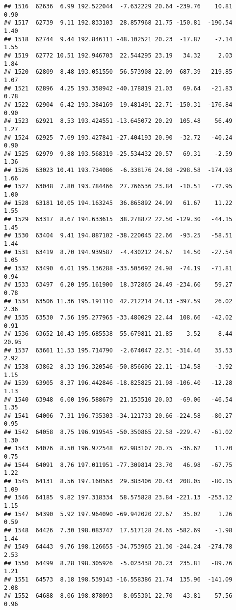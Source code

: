 \documentclass[]{article}
\begin{document}
\begin{verbatim}
## 1516  62636  6.99 192.522044  -7.632229 20.64 -239.76    10.81  0.90
## 1517  62739  9.11 192.833103  28.857968 21.75 -150.81  -190.54  1.40
## 1518  62744  9.44 192.846111 -48.102521 20.23  -17.87    -7.14  1.55
## 1519  62772 10.51 192.946703  22.544295 23.19   34.32     2.03  1.84
## 1520  62809  8.48 193.051550 -56.573908 22.09 -687.39  -219.85  1.07
## 1521  62896  4.25 193.358942 -40.178819 21.03   69.64   -21.83  0.78
## 1522  62904  6.42 193.384169  19.481491 22.71 -150.31  -176.84  0.90
## 1523  62921  8.53 193.424551 -13.645072 20.29  105.48    56.49  1.27
## 1524  62925  7.69 193.427841 -27.404193 20.90  -32.72   -40.24  0.90
## 1525  62979  9.88 193.568319 -25.534432 20.57   69.31    -2.59  1.36
## 1526  63023 10.41 193.734086  -6.338176 24.08 -298.58  -174.93  1.66
## 1527  63048  7.80 193.784466  27.766536 23.84  -10.51   -72.95  1.00
## 1528  63181 10.05 194.163245  36.865892 24.99   61.67    11.22  1.55
## 1529  63317  8.67 194.633615  38.278872 22.50 -129.30   -44.15  1.45
## 1530  63404  9.41 194.887102 -38.220045 22.66  -93.25   -58.51  1.44
## 1531  63419  8.70 194.939587  -4.430212 24.67   14.50   -27.54  1.05
## 1532  63490  6.01 195.136288 -33.505092 24.98  -74.19   -71.81  0.94
## 1533  63497  6.20 195.161900  18.372865 24.49 -234.60    59.27  0.78
## 1534  63506 11.36 195.191110  42.212214 24.13 -397.59    26.02  2.36
## 1535  63530  7.56 195.277965 -33.480029 22.44  108.66   -42.02  0.91
## 1536  63652 10.43 195.685538 -55.679811 21.85   -3.52     8.44 20.95
## 1537  63661 11.53 195.714790  -2.674047 22.31 -314.46    35.53  2.92
## 1538  63862  8.33 196.320546 -50.856606 22.11 -134.58    -3.92  1.15
## 1539  63905  8.37 196.442846 -18.825825 21.98 -106.40   -12.28  1.13
## 1540  63948  6.00 196.588679  21.153510 20.03  -69.06   -46.54  1.35
## 1541  64006  7.31 196.735303 -34.121733 20.66 -224.58   -80.27  0.95
## 1542  64058  8.75 196.919545 -50.350865 22.58 -229.47   -61.02  1.30
## 1543  64076  8.50 196.972548  62.983107 20.75  -36.62    11.70  0.75
## 1544  64091  8.76 197.011951 -77.309814 23.70   46.98   -67.75  1.22
## 1545  64131  8.56 197.160563  29.383406 20.43  208.05   -80.15  1.09
## 1546  64185  9.82 197.318334  58.575828 23.84 -221.13  -253.12  1.15
## 1547  64390  5.92 197.964090 -69.942020 22.67   35.02     1.26  0.59
## 1548  64426  7.30 198.083747  17.517128 24.65 -582.69    -1.98  1.44
## 1549  64443  9.76 198.126655 -34.753965 21.30 -244.24  -274.78  2.53
## 1550  64499  8.28 198.305926  -5.023438 20.23  235.81   -89.76  1.21
## 1551  64573  8.18 198.539143 -16.558386 21.74  135.96  -141.09  2.08
## 1552  64688  8.06 198.878093  -8.055301 22.70   43.81    57.56  0.96

\end{verbatim}
\end{document}

